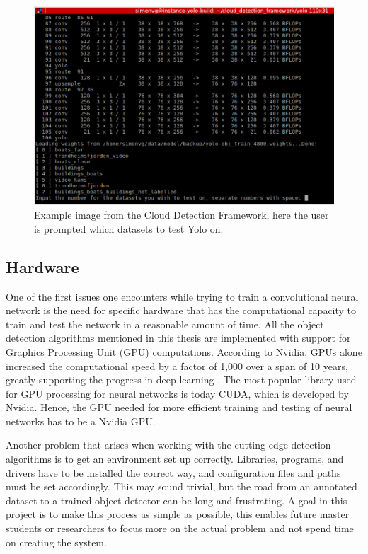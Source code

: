 \begin{figure}[h!]
    \centering
    \includegraphics[width=0.8 \textwidth]{images/cloud_detection_pic.eps}
    \caption{Example image from the Cloud Detection Framework, here the user is prompted which datasets to test Yolo on.}
    \label{fig:cloud_det}
\end{figure}

\subsection{Hardware}
One of the first issues one encounters while trying to train a convolutional neural network is the need for specific hardware that has the computational capacity to train and test the network in a reasonable amount of time. All the object detection algorithms mentioned in this thesis are implemented with support for Graphics Processing Unit (GPU) computations. According to Nvidia, GPUs alone increased the computational speed by a factor of 1,000 over a span of 10 years, greatly supporting the progress in deep learning \citep{Dettmers2015}. The most popular library used for GPU processing for neural networks is today CUDA, which is developed by Nvidia. Hence, the GPU needed for more efficient training and testing of neural networks has to be a Nvidia GPU. 

\vspace{3mm}

\noindent
Another problem that arises when working with the cutting edge detection algorithms is to get an environment set up correctly. Libraries, programs, and drivers have to be installed the correct way, and configuration files and paths must be set accordingly. This may sound trivial, but the road from an annotated dataset to a trained object detector can be long and frustrating. A goal in this project is to make this process as simple as possible, this enables future master students or researchers to focus more on the actual problem and not spend time on creating the system. 

